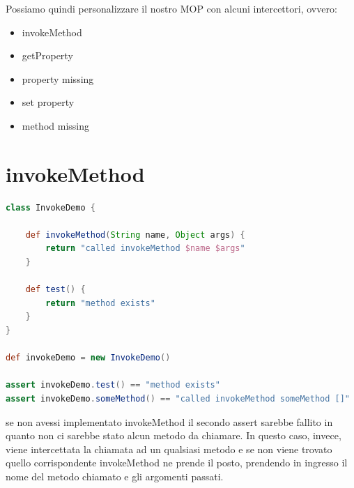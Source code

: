 \documentclass[11pt,a4paper]{book}
\begin{document}
Possiamo quindi personalizzare il nostro MOP con alcuni intercettori, ovvero:
\begin{itemize}
	\item invokeMethod
	\item getProperty
	\item property missing
	\item set property
	\item method missing
\end{itemize}

\section{invokeMethod}
\begin{lstlisting}[language = groovy]
class InvokeDemo {
	
	def invokeMethod(String name, Object args) {
		return "called invokeMethod $name $args"
	}
	
	def test() {
		return "method exists"
	}
}

def invokeDemo = new InvokeDemo()

assert invokeDemo.test() == "method exists"
assert invokeDemo.someMethod() == "called invokeMethod someMethod []"
\end{lstlisting}

se non avessi implementato invokeMethod il secondo assert sarebbe fallito in quanto non ci sarebbe stato alcun metodo da chiamare. In questo caso, invece, viene intercettata la chiamata ad un qualsiasi metodo e se non viene trovato quello corrispondente invokeMethod ne prende il posto, prendendo in ingresso il nome del metodo chiamato e gli argomenti passati.
\end{document}
